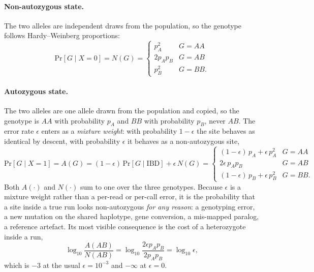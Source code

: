 \documentclass[11pt]{article}
\renewcommand{\Pr}[1]{\mathrm{Pr}\!\left[#1\right]}
\begin{document}
\paragraph{Non-autozygous state.} The two alleles are independent draws from the population, so the genotype follows Hardy--Weinberg proportions:
\begin{equation}
\Pr{G \mid X = 0} = N(G) =
\begin{cases}
p_A^2 & G = AA \\
2 p_A p_B & G = AB \\
p_B^2 & G = BB .
\end{cases}
\label{eq:N}
\end{equation}

\paragraph{Autozygous state.} The two alleles are one allele drawn from the population and copied, so the genotype is $AA$ with probability $p_A$ and $BB$ with probability $p_B$, never $AB$. The error rate $\epsilon$ enters as a \emph{mixture weight}: with probability $1 - \epsilon$ the site behaves as identical by descent, with probability $\epsilon$ it behaves as a non-autozygous site,
\begin{equation}
\Pr{G \mid X = 1} = A(G) = (1-\epsilon)\,\Pr{G \mid \text{IBD}} + \epsilon\, N(G) =
\begin{cases}
(1-\epsilon)\, p_A + \epsilon\, p_A^2 & G = AA \\
2\epsilon\, p_A p_B & G = AB \\
(1-\epsilon)\, p_B + \epsilon\, p_B^2 & G = BB .
\end{cases}
\label{eq:A}
\end{equation}
Both $A(\cdot)$ and $N(\cdot)$ sum to one over the three genotypes. Because $\epsilon$ is a mixture weight rather than a per-read or per-call error, it is the probability that a site inside a true run looks non-autozygous \emph{for any reason}: a genotyping error, a new mutation on the shared haplotype, gene conversion, a mis-mapped paralog, a reference artefact. Its most visible consequence is the cost of a heterozygote inside a run,
\begin{equation}
\log_{10} \frac{A(AB)}{N(AB)} = \log_{10} \frac{2\epsilon p_A p_B}{2 p_A p_B} = \log_{10} \epsilon ,
\label{eq:hetcost}
\end{equation}
which is $-3$ at the usual $\epsilon = 10^{-3}$ and $-\infty$ at $\epsilon = 0$.
\end{document}
